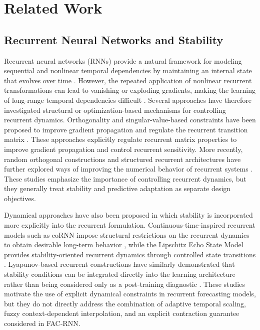 \documentclass[journal]{IEEEtran}
\begin{document}
\section{Related Work}

\subsection{Recurrent Neural Networks and Stability}

Recurrent neural networks (RNNs) provide a natural framework for modeling sequential and nonlinear temporal dependencies by maintaining an internal state that evolves over time \cite{bengio1994learning,hochreiter1997long}. However, the repeated application of nonlinear recurrent transformations can lead to vanishing or exploding gradients, making the learning of long-range temporal dependencies difficult \cite{pascanu2013difficulty}. Several approaches have therefore investigated structural or optimization-based mechanisms for controlling recurrent dynamics. Orthogonality and singular-value-based constraints have been proposed to improve gradient propagation and regulate the recurrent transition matrix \cite{vorontsov2017orthogonality,zhang2018svd}. These approaches explicitly regulate recurrent matrix properties to improve gradient propagation and control recurrent sensitivity. More recently, random orthogonal constructions and structured recurrent architectures have further explored ways of improving the numerical behavior of recurrent systems \cite{ceni2025random}. These studies emphasize the importance of controlling recurrent dynamics, but they generally treat stability and predictive adaptation as separate design objectives.

Dynamical approaches have also been proposed in which stability is incorporated more explicitly into the recurrent formulation. Continuous-time-inspired recurrent models such as coRNN impose structural restrictions on the recurrent dynamics to obtain desirable long-term behavior \cite{rusch2021corNN}, while the Lipschitz Echo State Model provides stability-oriented recurrent dynamics through controlled state transitions \cite{erichson2021lipschitz}. Lyapunov-based recurrent constructions have similarly demonstrated that stability conditions can be integrated directly into the learning architecture rather than being considered only as a post-training diagnostic \cite{vogt2022lyapunov}. These studies motivate the use of explicit dynamical constraints in recurrent forecasting models, but they do not directly address the combination of adaptive temporal scaling, fuzzy context-dependent interpolation, and an explicit contraction guarantee considered in FAC-RNN.
\end{document}

